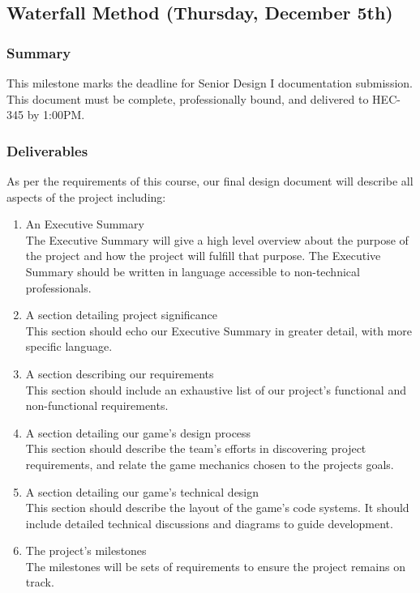 \subsection{Waterfall Method (Thursday, December 5th)}

\subsubsection*{Summary}
This milestone marks the deadline for Senior Design I documentation submission. This document 
must be complete, professionally bound, and delivered to HEC-345 by 1:00PM.

\subsubsection*{Deliverables}
As per the requirements of this course, our final design document will describe
all aspects of the project including:
\begin{enumerate}
	\item An Executive Summary\\
	The Executive Summary will give a high level overview about the purpose of the project 
	and how the project will fulfill that purpose. The Executive Summary should be written in 
	language accessible to non-technical professionals.
	\item A section detailing project significance\\
	This section should echo our Executive Summary in greater detail, with more specific language.
	\item A section describing our requirements\\
	This section should include an exhaustive list of our project's functional and non-functional requirements.
	\item A section detailing our game's design process\\
	This section should describe the team's efforts in discovering project requirements, and relate 
	the game mechanics chosen to the projects goals.
	\item A section detailing our game's technical design\\
	This section should describe the layout of the game's code systems. It should include 
	detailed technical discussions and diagrams to guide development.
	\item The project's milestones\\
	The milestones will be sets of requirements to ensure the project remains on track.
\end{enumerate}

